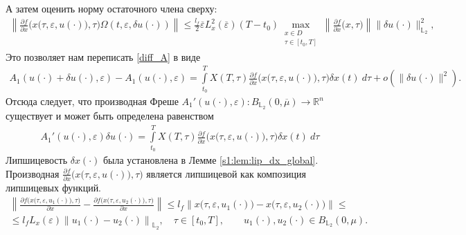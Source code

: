 \documentclass[../main.tex]{subfiles}
\begin{document}
А затем оценить норму остаточного члена сверху:
\begin{gather*}
    \left\| 
    \frac{\partial f}{\partial x} \Big(x\big(\tau,\varepsilon, u(\cdot)\big), \tau\Big) \Omega(t,\varepsilon, \delta u(\cdot)) 
    \right\| 
    \leqslant
    \frac{l_f}{2}
    \overline{\varepsilon} 
    L_x^2(\overline{\varepsilon})
    (T-t_0)
    \max_{\substack{x\in D \\ \tau \in [t_0,T]}} 
    \left\|\frac{\partial f}{\partial x} \Big(x, \tau\Big) \right\|
    \|\delta u(\cdot)\|_{\mathbb{L}_2}^2,
\end{gather*}
Это позволяет нам переписать \eqref{diff_A} в виде
\begin{gather}
    A_1(u(\cdot) + \delta u(\cdot),\varepsilon) - A_1(u(\cdot) ,\varepsilon) = \int\limits_{t_0}^T X(T,\tau) \frac{\partial f}{\partial x}  \Big(x\big(\tau,\varepsilon, u(\cdot)\big), \tau\Big) \delta x(t) \ d\tau + o(\|\delta u(\cdot)\|^2).
\end{gather}
Отсюда следует, что производная Фреше  $A_1'(u(\cdot),\varepsilon): B_{\mathbb{L}_2}(0,\overline{\mu}) \to \mathbb{R}^n $ существует и может быть определена равенством
\begin{gather}\label{A1_diff}
    A_1'(u(\cdot),\varepsilon)\delta u(\cdot) = \int\limits_{t_0}^T X(T,\tau) \frac{\partial f}{\partial x}  \Big(x\big(\tau,\varepsilon, u(\cdot)\big), \tau\Big) \delta x(t) \ d\tau 
\end{gather}
Липшицевость $\delta x(\cdot)$ была установлена в Лемме \ref{s1:lem:lip_dx_global}. 
Производная $\frac{\partial f}{\partial x} \Big(x\big(\tau,\varepsilon, u(\cdot)\big),\tau\Big)$ является липшицевой как композиция липшицевых функций.
\begin{gather*}
    \left\| \frac{\partial f \Big(x\big(\tau,\varepsilon, u_1(\cdot)\big),\tau\Big)} {\partial x} - \frac{\partial f \Big(x\big(\tau,\varepsilon, u_2(\cdot)\big),\tau\Big)} {\partial x} \right\| \leqslant l_f \left\|x\big(\tau,\varepsilon, u_1(\cdot) \big) - x\big(\tau,\varepsilon, u_2(\cdot)\big) \right\| \leqslant \\ \leqslant l_f L_x(\varepsilon) \left\| u_1(\cdot) - u_2(\cdot) \right\|_{\mathbb{L}_2}, \quad \tau \in [t_0, T], \qquad u_1(\cdot), u_2(\cdot) \in B_{\mathbb{L}_2}(0,\mu).
\end{gather*}
\end{document}
